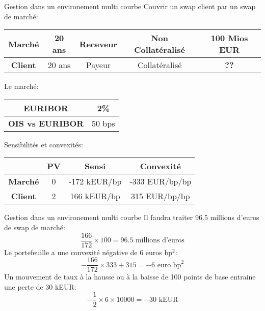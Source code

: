 \documentclass{beamer}
\begin{document}
\begin{frame}{Gestion dans un environement multi courbe}
\small
Couvrir un swap client par un swap de marché:\\
\begin{center}
\begin{tabular}{|c|c|c|c|c|}
\hline
\textbf{Marché} &20 ans&Receveur&Non Collatéralisé&100 Mios EUR \\ 
\hline
\textbf{Client} &20 ans&Payeur&Collatéralisé&\textbf{??} \\ 
\hline
\end{tabular}
\end{center}
Le marché:\\
\begin{center}
\begin{tabular}{|c|c|}
\hline
\textbf{EURIBOR} & 2\% \\
\hline
\textbf{OIS vs EURIBOR} & 50 bps \\
\hline
\end{tabular}
\end{center}
Sensibilités et convexités:
\begin{center}
\begin{tabular}{|c|c|c|c|}
\hline
&\textbf{PV}&\textbf{Sensi}& \textbf{Convexité}  \\ 
\hline
\textbf{Marché} & 0&-172 kEUR/bp&-333 EUR/bp/bp \\ 
\hline
\textbf{Client} & 2&166 kEUR/bp&315 EUR/bp/bp \\ 
\hline
\end{tabular}
\end{center}

\end{frame}
\begin{frame}{Gestion dans un environement multi courbe}
Il faudra traiter 96.5 millions d'euros de swap de marché:\\
\[
\frac{166}{172} \times 100 = 96.5 \text{ millions d'euros}
\]  
Le portefeuille a une convexité négative de 6 euros bp$^2$:\\
\[
- \frac{166}{172} \times 333 + 315 = -6 \text{ euro bp}^2 
\]
Un mouvement de taux à la hausse ou à la baisse de 100 points de base entraine une perte de 30 kEUR:\\
\[
- \frac{1}{2} \times 6 \times 10000 = -30\text{ kEUR}  
\]
\end{frame}
\end{document}
